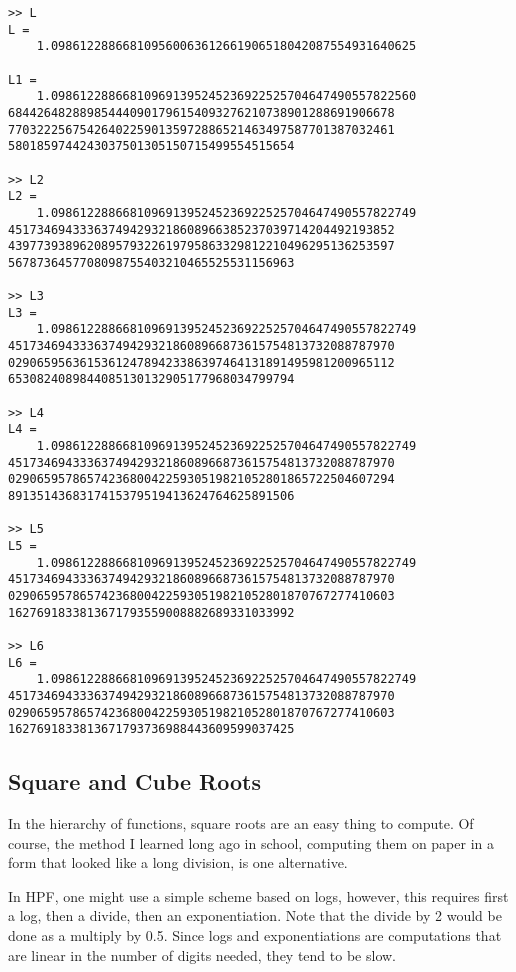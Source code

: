 \documentclass[a4paper,12pt]{article}
\begin{document}
\begin{lstlisting}
>> L
L =
    1.098612288668109560063612661906518042087554931640625

L1 =
    1.098612288668109691395245236922525704647490557822560
684426482889854440901796154093276210738901288691906678
770322256754264022590135972886521463497587701387032461
5801859744243037501305150715499554515654

>> L2
L2 =
    1.098612288668109691395245236922525704647490557822749
451734694333637494293218608966385237039714204492193852
439773938962089579322619795863329812210496295136253597
5678736457708098755403210465525531156963

>> L3
L3 =
    1.098612288668109691395245236922525704647490557822749
451734694333637494293218608966873615754813732088787970
029065956361536124789423386397464131891495981200965112
6530824089844085130132905177968034799794

>> L4
L4 =
    1.098612288668109691395245236922525704647490557822749
451734694333637494293218608966873615754813732088787970
029065957865742368004225930519821052801865722504607294
8913514368317415379519413624764625891506

>> L5
L5 =
    1.098612288668109691395245236922525704647490557822749
451734694333637494293218608966873615754813732088787970
029065957865742368004225930519821052801870767277410603
1627691833813671793559008882689331033992

>> L6
L6 =
    1.098612288668109691395245236922525704647490557822749
451734694333637494293218608966873615754813732088787970
029065957865742368004225930519821052801870767277410603
1627691833813671793736988443609599037425
\end{lstlisting}


\subsection{Square and Cube Roots}

In the hierarchy of functions, square roots are an easy thing to compute. Of course, the method I learned long ago in school, computing them on paper in a form that looked like a long division, is one alternative.

In HPF, one might use a simple scheme based on logs, however, this requires first a log, then a divide, then an exponentiation. Note that the divide by 2 would be done as a multiply by 0.5. Since logs and exponentiations are computations that are linear in the number of digits needed, they tend to be slow.
\end{document}
